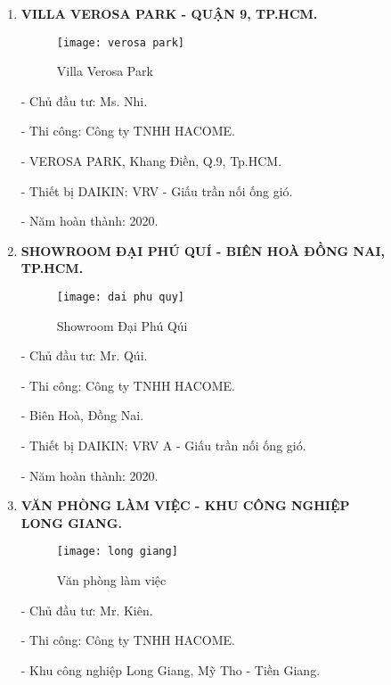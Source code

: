 \documentclass[12pt,a4paper]{article}
\begin{document}
\begin{enumerate}
\begin{enumerate}
\item \textbf{VILLA VEROSA PARK - QUẬN 9, TP.HCM.}
\begin{figure}[H]
  \centering
  \texttt{[image: verosa park]}
  \caption{Villa Verosa Park}
\end{figure}

\hspace{1cm} - Chủ đầu tư: Ms. Nhi.

\hspace{1cm} - Thi công: Công ty TNHH HACOME.

\hspace{1cm} - VEROSA PARK, Khang Điền, Q.9, Tp.HCM.

\hspace{1cm} - Thiết bị DAIKIN: VRV - Giấu trần nối ống gió.

\hspace{1cm} - Năm hoàn thành: 2020.

\item \textbf{SHOWROOM ĐẠI PHÚ QUÍ - BIÊN HOÀ ĐỒNG NAI, TP.HCM.}
\begin{figure}[H]
  \centering
  \texttt{[image: dai phu quy]}
  \caption{Showroom Đại Phú Qúi}
\end{figure}

\hspace{1cm} - Chủ đầu tư: Mr. Qúi.

\hspace{1cm} - Thi công: Công ty TNHH HACOME.

\hspace{1cm} - Biên Hoà, Đồng Nai.

\hspace{1cm} - Thiết bị DAIKIN: VRV A - Giấu trần nối ống gió.

\hspace{1cm} - Năm hoàn thành: 2020.

\newpage
\item \textbf{VĂN PHÒNG LÀM VIỆC - KHU CÔNG NGHIỆP\\
 LONG GIANG.}
\begin{figure}[H]
  \centering
  \texttt{[image: long giang]}
  \caption{Văn phòng làm việc}
\end{figure}

\hspace{1cm} - Chủ đầu tư: Mr. Kiên.

\hspace{1cm} - Thi công: Công ty TNHH HACOME.

\hspace{1cm} - Khu công nghiệp Long Giang, Mỹ Tho - Tiền Giang.


\end{enumerate}
\end{enumerate}
\end{document}
